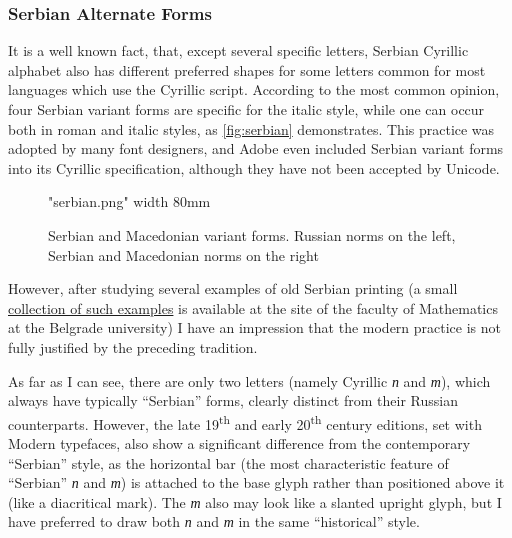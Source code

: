 \documentclass[12pt,a4paper,openany]{book}
\begin{document}
\subsubsection{Serbian Alternate Forms}

It is a well known fact, that, except several specific letters, Serbian
Cyrillic alphabet also has different preferred shapes for some letters
common for most languages which use the Cyrillic script. According to the
most common opinion, four Serbian variant forms are specific for the
italic style, while one can occur both in roman and italic styles, as
\autoref{fig:serbian} demonstrates. This practice was adopted by many font
designers, and Adobe even included Serbian variant forms into its Cyrillic
specification, although they have not been accepted by Unicode.

\begin{figure}

\centerline{\XeTeXpicfile "serbian.png" width 80mm}

\caption{Serbian and Macedonian variant forms. Russian norms on the left,
Serbian and Macedonian norms on the right}
\label{fig:serbian}

\end{figure}

However, after studying several examples of old Serbian printing (a small
\href{http://alas.matf.bg.ac.yu/biblioteka/home.jsp}{collection of such
examples} is available at the site of the faculty of Mathematics at the
Belgrade university) I have an impression that the modern practice is not
fully justified by the preceding tradition.

As far as I can see, there are only two letters (namely Cyrillic \textit{п}
and \textit{т}), which always have typically “Serbian” forms, clearly
distinct from their Russian counterparts. However, the late
19\textsuperscript{th} and early 20\textsuperscript{th} century editions,
set with Modern typefaces, also show a significant difference from the
contemporary “Serbian” style, as the horizontal bar (the most
characteristic feature of “Serbian” \textit{п} and \textit{т}) is attached
to the base glyph rather than positioned above it (like a diacritical
mark). The \textit{т} also may look like a slanted upright glyph, but I
have preferred to draw both \textit{п} and \textit{т} in the same
“historical” style.
\end{document}
